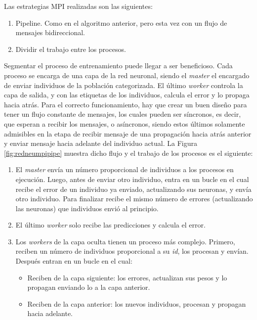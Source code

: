 	
	\noindent Las estrategias MPI realizadas son las siguientes:
	\begin{enumerate}				
		\item Pipeline. Como en el algoritmo anterior, pero esta vez con un flujo de mensajes bidireccional.
		\item Dividir el trabajo entre los procesos.
	\end{enumerate}
	
	Segmentar el proceso de entrenamiento puede llegar a ser beneficioso. Cada proceso se encarga de una capa de la red neuronal, siendo el \textit{master} el encargado de enviar individuos de la población categorizada. El último \textit{worker} controla la capa de salida, y con las etiquetas de los individuos, calcula el error y lo propaga hacia atrás. Para el correcto funcionamiento, hay que crear un buen diseño para tener un flujo constante de mensajes, los cuales pueden ser síncronos, es decir, que esperan a recibir los mensajes, o asíncronos, siendo estos últimos solamente admisibles en la etapa de recibir mensaje de una propagación hacia atrás anterior y enviar mensaje hacia adelante del individuo actual. La Figura \ref{fig:redneumpipipe} muestra dicho flujo y el trabajo de los procesos es el siguiente:	
	
	
	\begin{enumerate}
		\item El \textit{master} envía un número proporcional de individuos a los procesos en ejecución. Luego, antes de enviar otro individuo, entra en un bucle en el cual recibe el error de un individuo ya enviado, actualizando sus neuronas, y envía otro individuo. Para finalizar recibe el mismo número de errores (actualizando las neuronas) que individuos envió al principio.
		\item El último \textit{worker} solo recibe las predicciones y calcula el error.
		\item Los \textit{workers} de la capa oculta tienen un proceso más complejo. Primero, reciben un número de individuos proporcional a su \textit{id}, los procesan y envían. Después entran en un bucle en el cual:			
		\begin{itemize}
			\item Reciben de la capa siguiente: los errores, actualizan sus pesos y lo propagan enviando lo a la capa anterior.			
			\item Reciben de la capa anterior: los nuevos individuos, procesan y propagan hacia adelante.
		\end{itemize}		
		
	\end{enumerate}
	
